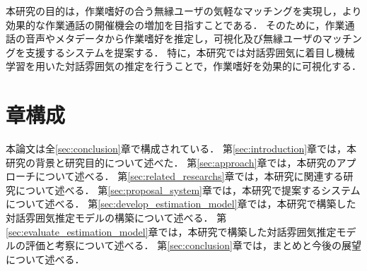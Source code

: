 本研究の目的は，作業嗜好の合う無縁ユーザの気軽なマッチングを実現し，より効果的な作業通話の開催機会の増加を目指すことである．
そのために，作業通話の音声やメタデータから作業嗜好を推定し，可視化及び無縁ユーザのマッチングを支援するシステムを提案する．
特に，本研究では対話雰囲気に着目し機械学習を用いた対話雰囲気の推定を行うことで，作業嗜好を効果的に可視化する．

\section{章構成}

本論文は全\ref{sec:conclusion}章で構成されている．
第\ref{sec:introduction}章では，本研究の背景と研究目的について述べた．
第\ref{sec:approach}章では，本研究のアプローチについて述べる．
第\ref{sec:related_researchs}章では，本研究に関連する研究について述べる．
第\ref{sec:proposal_system}章では，本研究で提案するシステムについて述べる．
第\ref{sec:develop_estimation_model}章では，本研究で構築した対話雰囲気推定モデルの構築について述べる．
第\ref{sec:evaluate_estimation_model}章では，本研究で構築した対話雰囲気推定モデルの評価と考察について述べる．
第\ref{sec:conclusion}章では，まとめと今後の展望について述べる．
